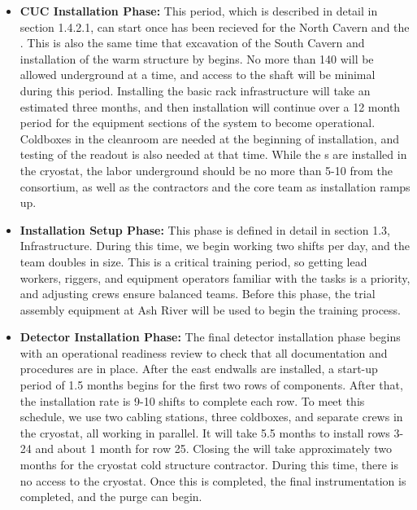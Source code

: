 \begin{itemize}
    \item {\bf CUC Installation Phase:}
    This period, which is described in detail in section 1.4.2.1, can start once  has been recieved for the North Cavern and the . This is also the same time that excavation of the South Cavern and installation of the warm structure by  begins. No more than 140  will be allowed underground at a time, and access to the shaft will be minimal during this period.  Installing the basic rack infrastructure will take an estimated three months, and then installation will continue over a 12 month period for the  equipment sections of the system to become operational. Coldboxes in the cleanroom are needed at the beginning of installation, and testing of the readout is also needed at that time. While the s are installed in the cryostat, the labor underground should be no more than 5-10  from the  consortium, as well as the contractors and the core  team as installation ramps up. 
    
    \item {\bf Installation Setup Phase:} This phase is defined in detail in section 1.3, Infrastructure. During this time, we begin working two shifts per day, and the  team doubles in size.  This is a critical training period, so getting lead workers, riggers, and equipment operators familiar with the tasks is a priority, and adjusting crews ensure balanced teams.  Before this phase, the  trial assembly equipment at Ash River will be used to begin the training process.
    
    \item {\bf Detector Installation Phase:} The final detector installation phase begins with an operational readiness review to check that all documentation and procedures are in place. After the east endwalls are installed, a start-up period of 1.5 months begins for the first two rows of  components. After that, the installation rate is 9-10 shifts to complete each row.  To meet this schedule, we use two  cabling stations, three coldboxes, and separate crews in the cryostat, all working in parallel.  It will take 5.5 months to install rows 3-24 and about 1 month for row 25. Closing the  will take approximately two months for the cryostat cold structure contractor. During this time, there is no access to the cryostat.  Once this is completed, the final instrumentation is completed, and the purge can begin. 
    
\end{itemize}

